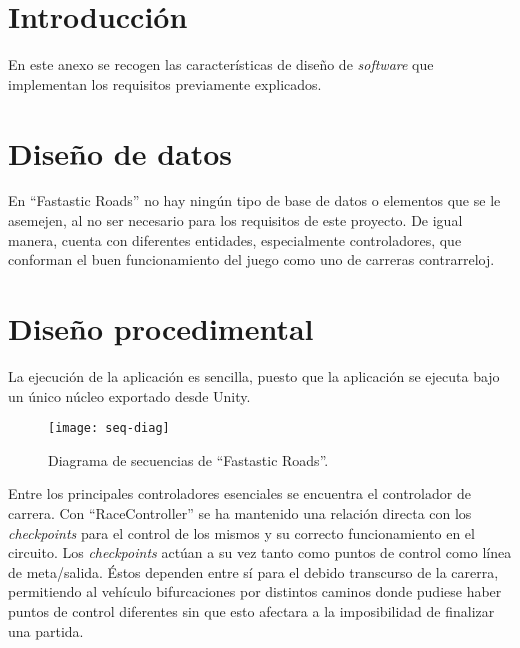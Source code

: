 
\section{Introducción}

En este anexo se recogen las características de diseño de \textit{software} que implementan los requisitos previamente explicados.

\section{Diseño de datos}

En ``Fastastic Roads'' no hay ningún tipo de base de datos o elementos que se le asemejen, al no ser necesario para los requisitos de este proyecto. De igual manera, cuenta con diferentes entidades, especialmente controladores, que conforman el buen funcionamiento del juego como uno de carreras contrarreloj.


\section{Diseño procedimental}

La ejecución de la aplicación es sencilla, puesto que la aplicación se ejecuta bajo un único núcleo exportado desde Unity.

\begin{figure}[h]
	\centering
	\texttt{[image: seq-diag]}
	\caption{Diagrama de secuencias de ``Fastastic Roads''.}
	\label{fig:seq-diag}
\end{figure}

Entre los principales controladores esenciales se encuentra el controlador de carrera. Con ``RaceController'' se ha mantenido una relación directa con los \textit{checkpoints} para el control de los mismos y su correcto funcionamiento en el circuito. Los \textit{checkpoints} actúan a su vez tanto como puntos de control como línea de meta/salida. Éstos dependen entre sí para el debido transcurso de la carerra, permitiendo al vehículo bifurcaciones por distintos caminos donde pudiese haber puntos de control diferentes sin que esto afectara a la imposibilidad de finalizar una partida. 


